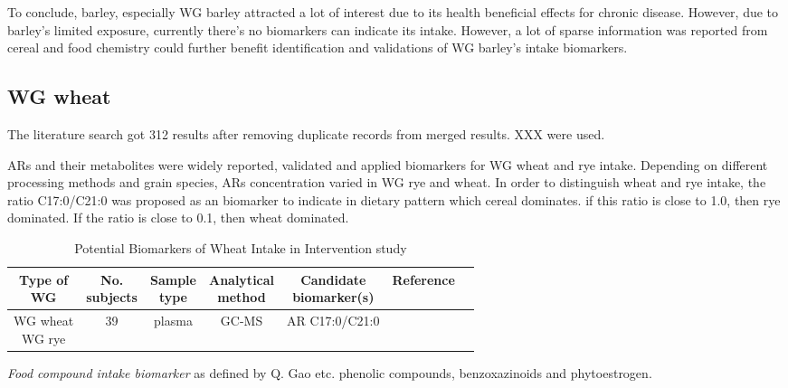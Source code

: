 To conclude, barley, especially WG barley attracted a lot of interest due to its health beneficial effects for chronic disease. However, due to barley's limited exposure, currently there's no biomarkers can indicate its intake. However, a lot of sparse information was reported from cereal and food chemistry could further benefit identification and validations of WG barley's intake biomarkers.

\subsection{WG wheat}
The literature search got 312 results after removing duplicate records from merged results. XXX were used.

ARs and their metabolites were widely reported, validated and applied biomarkers for WG wheat and rye intake. Depending on different processing methods and grain species, ARs concentration varied in WG rye and wheat. In order to distinguish wheat and rye intake, the ratio C17:0/C21:0 was proposed as an biomarker to indicate in dietary pattern which cereal dominates. if this ratio is close to 1.0, then rye dominated. If the ratio is close to 0.1, then wheat dominated\cite{ISI:000376712600013}. 

\begin{table}[h!]
\begin{tabular}{|c|c|c|c|c|c|c|}
	\hline 
	\makecell{Type of\\ WG} & \makecell{No.\\subjects}  & \makecell{Sample\\type}  & \makecell{Analytical\\method}& \makecell{Candidate\\biomarker(s)} & Reference \\ 
	\hline 
	\makecell{WG wheat\\WG rye} & 39 & plasma & GC-MS & AR C17:0/C21:0 & \cite{ISI:000376712600013} \\ 
	\hline 
\end{tabular} 
\caption{Potential Biomarkers of Wheat Intake in Intervention study}
\label{table:wheat_intervention}
\end{table}


\textit{Food compound intake biomarker} as defined by Q. Gao etc\cite{Gao2017}.
phenolic compounds\cite{ISI:000389134200003}, benzoxazinoids\cite{ISI:000394168100034} and phytoestrogen\cite{ISI:000384082300001}.
